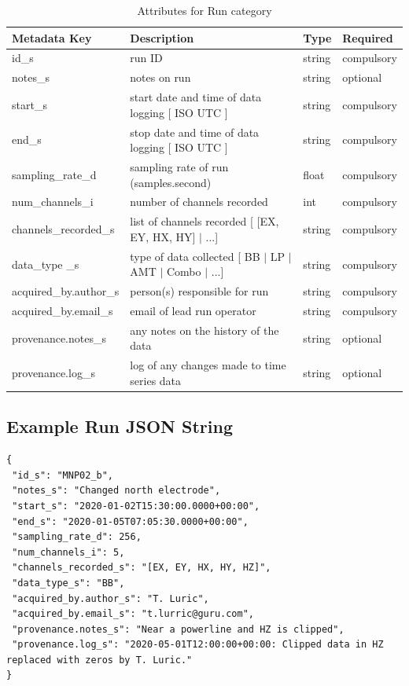 \documentclass{article}
\begin{document}
\begin{table}[htb!]
	\caption[Attributes for Run]{Attributes for Run category}
	\begin{tabular}{|l|p{3in}|l|l|}
		\hline
		\textbf{Metadata Key} & \textbf{Description} & \textbf{Type} & \textbf{Required} \\ \hline
		id\_s & run ID & string & compulsory \\ \hline
		notes\_s & notes on run & string & optional \\ \hline
		start\_s & start date and time of data logging [ ISO UTC ] & string & compulsory \\ \hline
		end\_s & stop date and time of data logging [ ISO UTC ] & string & compulsory \\ \hline
		sampling\_rate\_d & sampling rate of run (samples.second) & float & compulsory \\ \hline
		num\_channels\_i & number of channels recorded & int & compulsory \\ \hline
		channels\_recorded\_s & list of channels recorded [ [EX, EY, HX, HY] $|$ ...] & string & compulsory \\ \hline
		data\_type \_s & type of data collected [ BB $|$ LP $|$ AMT $|$ Combo $|$ ...] & string & compulsory \\ \hline
		acquired\_by.author\_s & person(s) responsible for run & string & compulsory \\ \hline
		acquired\_by.email\_s & email of lead run operator & string & compulsory \\ \hline
		provenance.notes\_s & any notes on the history of the data & string & optional \\ \hline
		provenance.log\_s & log of any changes made to time series data & string & optional \\ \hline
	\end{tabular}
	\label{tab:run}
\end{table}

\subsection{Example Run JSON String}

\begin{verbatim}
{
 "id_s": "MNP02_b",
 "notes_s": "Changed north electrode",
 "start_s": "2020-01-02T15:30:00.0000+00:00",
 "end_s": "2020-01-05T07:05:30.0000+00:00",
 "sampling_rate_d": 256,
 "num_channels_i": 5,
 "channels_recorded_s": "[EX, EY, HX, HY, HZ]",
 "data_type_s": "BB",
 "acquired_by.author_s": "T. Luric",
 "acquired_by.email_s": "t.lurric@guru.com",
 "provenance.notes_s": "Near a powerline and HZ is clipped",
 "provenance.log_s": "2020-05-01T12:00:00+00:00: Clipped data in HZ replaced with zeros by T. Luric."
}
\end{verbatim}
\end{document}
